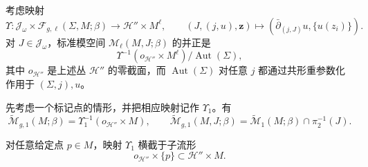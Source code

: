 考虑映射
\[
 \Upsilon:\mathcal J_\omega\times\mathcal F_{g,\ell}(\Sigma,M;\beta)
 \longrightarrow\mathcal H''\times M^\ell,
 \qquad
 (J,(j,u),\boldsymbol z)\longmapsto
 (\bar\partial_{(j,J)}u,\{u(z_i)\}).
\]
对 $J\in\mathcal J_\omega$，标准模空间 $\mathcal M_\ell(M,J;\beta)$ 的并正是
\begin{equation}
 \Upsilon^{-1}(o_{\mathcal H''}\times M^\ell)/\operatorname{Aut}(\Sigma),
 \label{eq:standard-moduli-as-zero-set}
\end{equation}
其中 $o_{\mathcal H''}$ 是上述丛 $\mathcal H''$ 的零截面，而
$\operatorname{Aut}(\Sigma)$ 对任意 $j$ 都通过共形重参数化作用于
$(\Sigma,j),u$。

先考虑一个标记点的情形，并把相应映射记作 $\Upsilon_1$。有
\[
 \widetilde{\mathcal M}_{g,1}(M;\beta)
 =\Upsilon_1^{-1}(o_{\mathcal H''}\times M),
 \qquad
 \widetilde{\mathcal M}_{g,1}(M,J;\beta)
 =\widetilde{\mathcal M}_1(M;\beta)\cap\pi_2^{-1}(J).
\]

\begin{proposition}\label{prop:one-point-evaluation-transverse}
对任意给定点 $p\in M$，映射 $\Upsilon_1$ 横截于子流形
\[
 o_{\mathcal H''}\times\{p\}\subset\mathcal H''\times M.
\]
\end{proposition}


